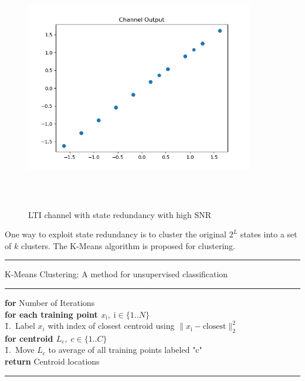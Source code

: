 \documentclass[12pt,a4paper]{report}
\begin{document}
\begin{figure}[H]
\centering
	\includegraphics[width=10cm,height = 10cm]{system_model/channel_output}
	  \label{fig:redundant_channel}
	  	  \caption{LTI channel with state redundancy with high SNR}
\end{figure}

One way to exploit state redundancy is to cluster the original $2^L$ states into a set of $k$ clusters. The K-Means algorithm is proposed for clustering.
\\

    \noindent\rule[16pt]{\textwidth}{0.6pt}
K-Means Clustering: A method for unsupervised classification

    \noindent\rule[10pt]{\textwidth}{0.4pt}
    {\footnotesize
    \begin{tabbing}
        {\textbf{for} Number of Iterations}\\
         \qquad \= {\bf for each training point $x_{\mathrm{i}}, \;\mathrm{i}  \in \{1..N\}$}\\
        \qquad \qquad \= 1.\ Label $x_i$ with index of closest centroid using $\|x_{\mathrm{i}}- \text{closest}\|^2_2$ \\
        \qquad \= {\bf for centroid $L_{\mathrm{c}}, \;c \in \{1..C\}$}\\
                \qquad \qquad \= 1.\ Move $L_{\mathrm{c}}$ to average of all training points labeled "c"\\


        {\bf return} Centroid locations
    \end{tabbing}}
    \noindent\rule[10pt]{\textwidth}{0.4pt}
    
\end{document}

